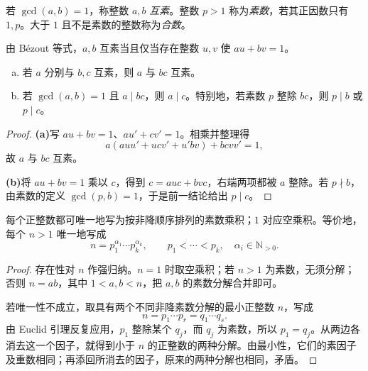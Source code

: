 \documentclass[lang=cn,a4paper,fontset=none,zihao=false,10pt,openany,twoside]{beautybook}
\numberwithin{algorithm}{chapter}
\newcommand{\N}{\mathbb N}
\begin{document}
\begin{definition}[互素与素数]
若 $\gcd(a,b)=1$，称整数 $a,b$ \emph{互素}。整数 $p>1$ 称为\emph{素数}，若其正因数只有 $1,p$。大于 $1$ 且不是素数的整数称为\emph{合数}。
\end{definition}
由 Bézout 等式，$a,b$ 互素当且仅当存在整数 $u,v$ 使 $au+bv=1$。

\begin{lemma}\label{lem:euclid-prime}
\begin{enumerate}[(a)]
\item 若 $a$ 分别与 $b,c$ 互素，则 $a$ 与 $bc$ 互素。
\item 若 $\gcd(a,b)=1$ 且 $a\mid bc$，则 $a\mid c$。特别地，若素数 $p$ 整除 $bc$，则 $p\mid b$ 或 $p\mid c$。
\end{enumerate}
\end{lemma}
\begin{proof}
\par\smallskip\noindent\textbf{(a)}\quad 写 $au+bv=1$、$au'+cv'=1$。相乘并整理得
\[
 a(auu'+ucv'+u'bv)+bcvv'=1,
\]
故 $a$ 与 $bc$ 互素。

\par\smallskip\noindent\textbf{(b)}\quad 将 $au+bv=1$ 乘以 $c$，得到 $c=auc+bvc$，右端两项都被 $a$ 整除。若 $p\nmid b$，由素数的定义 $\gcd(p,b)=1$，于是前一结论给出 $p\mid c$。
\end{proof}

\begin{theorem}[算术基本定理]
每个正整数都可唯一地写为按非降顺序排列的素数乘积；$1$ 对应空乘积。等价地，每个 $n>1$ 唯一地写成
\[
 n=p_1^{\alpha_1}\cdots p_k^{\alpha_k},\qquad
 p_1<\cdots<p_k,\quad\alpha_i\in\N_{>0}.
\]
\end{theorem}
\begin{proof}
存在性对 $n$ 作强归纳。$n=1$ 时取空乘积；若 $n>1$ 为素数，无须分解；否则 $n=ab$，其中 $1<a,b<n$，把 $a,b$ 的素数分解合并即可。

若唯一性不成立，取具有两个不同非降素数分解的最小正整数 $n$，写成
\[
 n=p_1\cdots p_r=q_1\cdots q_s.
\]
由 Euclid 引理反复应用，$p_1$ 整除某个 $q_j$，而 $q_j$ 为素数，所以 $p_1=q_j$。从两边各消去这一个因子，就得到小于 $n$ 的正整数的两种分解。由最小性，它们的素因子及重数相同；再添回所消去的因子，原来的两种分解也相同，矛盾。
\end{proof}
\end{document}
